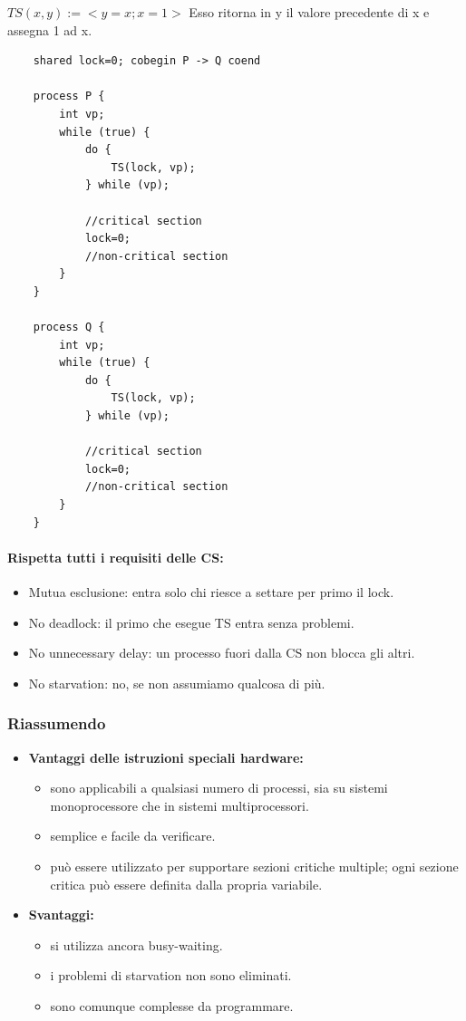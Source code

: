 $TS(x,y) := < y = x ; x = 1 >$
\newline
Esso ritorna in y il valore precedente di x e assegna 1 ad x.

\begin{lstlisting}
    shared lock=0; cobegin P -> Q coend
    
    process P {
        int vp;
        while (true) {
            do {
                TS(lock, vp);
            } while (vp);
            
            //critical section
            lock=0;
            //non-critical section
        }
    }

    process Q {
        int vp;
        while (true) {
            do {
                TS(lock, vp);
            } while (vp);
            
            //critical section
            lock=0;
            //non-critical section
        }
    }
\end{lstlisting}

\paragraph{Rispetta tutti i requisiti delle CS:}
\begin{itemize}
    \item Mutua esclusione: entra solo chi riesce a settare per primo il lock.
    \item No deadlock: il primo che esegue TS entra senza problemi.
    \item No unnecessary delay: un processo fuori dalla CS non blocca gli altri.
    \item No starvation: no, se non assumiamo qualcosa di più.
\end{itemize}

\subsubsection{Riassumendo}
\begin{itemize}
    \item \textbf{Vantaggi delle istruzioni speciali hardware:}
    \begin{itemize}
        \item sono applicabili a qualsiasi numero di processi, sia su sistemi monoprocessore che in sistemi multiprocessori.
        \item semplice e facile da verificare.
        \item può essere utilizzato per supportare sezioni critiche multiple; ogni sezione critica può essere definita dalla propria variabile.
    \end{itemize}
    \item \textbf{Svantaggi:}
    \begin{itemize}
        \item si utilizza ancora busy-waiting.
        \item i problemi di starvation non sono eliminati.
        \item sono comunque complesse da programmare.
    \end{itemize}
\end{itemize}

